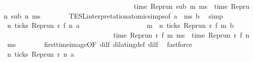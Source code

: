 \begin{isabellebody}
\ \ \ \ \ \ \ \ \ \ \ \ \ \ \ \ \ \ \ \ \ \ \ \ \ \ \ \ \ \ \ \ \ \ \ \ \ {\isasymand}\ time\ {\isacharparenleft}{\isacharparenleft}Rep{\isacharunderscore}run\ sub{\isacharparenright}\ m\ ms{\isacharparenright}\ {\isacharequal}\ time\ {\isacharparenleft}{\isacharparenleft}Rep{\isacharunderscore}run\ sub{\isacharparenright}\ n\ ms{\isacharparenright}\ {\isacharplus}\ {\isasymdelta}{\isasymtau}{\isacharparenright}{\isacartoucheclose}\isanewline
\ \ \ \ \isamarkupfalse%
\ TESL{\isacharunderscore}interpretation{\isacharunderscore}atomic{\isachardot}simps{\isacharparenleft}{}{\isacharparenright}{\isacharbrackleft}of\ {\isacartoucheopen}a{\isacartoucheclose}\ {\isacartoucheopen}{\isasymdelta}{\isasymtau}{\isacartoucheclose}\ {\isacartoucheopen}ms{\isacartoucheclose}\ {\isacartoucheopen}b{\isacartoucheclose}{\isacharbrackright}\ \isamarkupfalse%
\ simp\isanewline
\ \ \isamarkupfalse%
\ {\isacharasterisk}{\isacharasterisk}{\isacharcolon}{\isacartoucheopen}{\isasymforall}n\ ticks\ {\isacharparenleft}{\isacharparenleft}Rep{\isacharunderscore}run\ r{\isacharparenright}\ {\isacharparenleft}f\ n\ a{\isacharparenright}\isanewline
\ \ \ \ \ \ \ \ \ \ \ \ \ \ \ \ \ \ {\isasymlongrightarrow}\ {\isacharparenleft}{\isasymexists}m\ {\isasymge}\ n\ ticks\ {\isacharparenleft}{\isacharparenleft}Rep{\isacharunderscore}run\ r{\isacharparenright}\ {\isacharparenleft}f\ m\ b{\isacharparenright}\isanewline
\ \ \ \ \ \ \ \ \ \ \ \ \ \ \ \ \ \ \ \ \ \ \ \ \ \ \ \ \ \ \ {\isasymand}\ time\ {\isacharparenleft}{\isacharparenleft}Rep{\isacharunderscore}run\ r{\isacharparenright}\ {\isacharparenleft}f\ m\ ms{\isacharparenright}\ {\isacharequal}\ time\ {\isacharparenleft}{\isacharparenleft}Rep{\isacharunderscore}run\ r{\isacharparenright}\ {\isacharparenleft}f\ n\ ms{\isacharparenright}\ {\isacharplus}\ {\isasymdelta}{\isasymtau}{\isacharparenright}{\isacartoucheclose}\isanewline
\ \ \ \ \isamarkupfalse%
\ first{\isacharunderscore}time{\isacharunderscore}image{\isacharbrackleft}OF\ dilf{\isacharbrackright}\ dilating{\isacharunderscore}def\ dilf\ \isamarkupfalse%
\ fastforce\isanewline
\ \ \isamarkupfalse%
\ {\isacartoucheopen}{\isasymforall}n{\isachardot}\ ticks\ {\isacharparenleft}{\isacharparenleft}Rep{\isacharunderscore}run\ r{\isacharparenright}\ n\ a{\isacharparenright}\isanewline

\end{isabellebody}
